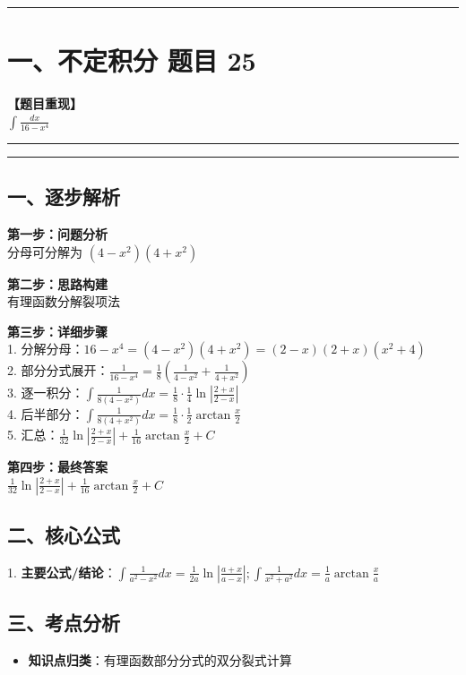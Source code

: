 ﻿\documentclass[12pt, a4paper]{ctexart}
\newcommand{\TopSeparator}{
    \par\noindent\rule{\textwidth}{1.5pt}\vspace{0.5em}
}
\newcommand{\AnalysisSeparator}{
    \par\noindent\rule{\textwidth}{0.5pt}\vspace{0.2em}\hrule\vspace{0.5em}
}
\newenvironment{RedAnalysis}{
    \par
    \color{red} 
}{
    \par
    \color{black} 
}
\begin{document}
\vspace{2em}

\TopSeparator
\section*{一、不定积分 题目 25}

\textbf{【题目重现】} \\
$\int \frac{dx}{16-x^4}$

\AnalysisSeparator

\begin{RedAnalysis}

	\subsection*{一、逐步解析}

	\textbf{第一步：问题分析} \\
	分母可分解为 $(4-x^2)(4+x^2)$

	\textbf{第二步：思路构建} \\
	有理函数分解裂项法

	\textbf{第三步：详细步骤} \\
	1. 分解分母：$16-x^4 = (4-x^2)(4+x^2) = (2-x)(2+x)(x^2+4)$ \\ 
	2. 部分分式展开：$\frac{1}{16-x^4} = \frac{1}{8}(\frac{1}{4-x^2} + \frac{1}{4+x^2})$ \\ 
	3. 逐一积分：$\int \frac{1}{8(4-x^2)} dx = \frac{1}{8} \cdot \frac{1}{4} \ln|\frac{2+x}{2-x}|$ \\ 
	4. 后半部分：$\int \frac{1}{8(4+x^2)} dx = \frac{1}{8} \cdot \frac{1}{2} \arctan\frac{x}{2}$ \\ 
	5. 汇总：$\frac{1}{32}\ln|\frac{2+x}{2-x}| + \frac{1}{16}\arctan\frac{x}{2} + C$

	\textbf{第四步：最终答案} \\
	$\frac{1}{32}\ln\left|\frac{2+x}{2-x}\right| + \frac{1}{16}\arctan\frac{x}{2} + C$

	\subsection*{二、核心公式}
	1. \textbf{主要公式/结论}：$\int \frac{1}{a^2-x^2}dx=\frac{1}{2a}\ln|\frac{a+x}{a-x}|; \int \frac{1}{x^2+a^2}dx=\frac{1}{a}\arctan\frac{x}{a}$

	\subsection*{三、考点分析}
	\begin{itemize}
		\item \textbf{知识点归类}：有理函数部分分式的双分裂式计算
	\end{itemize}

\end{RedAnalysis}
\end{document}
